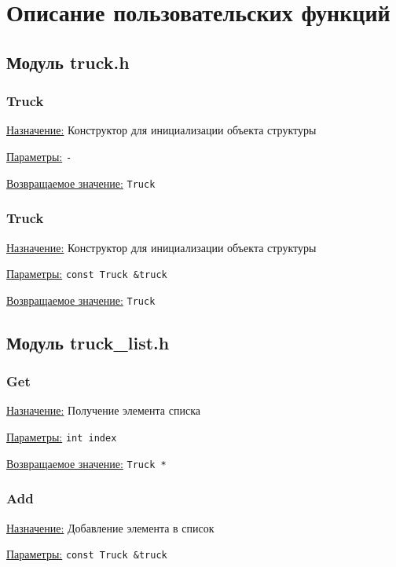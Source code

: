 \section*{Описание пользовательских функций}

\subsection*{Модуль truck.h}

\subsubsection*{Truck}

\underline{Назначение:} Конструктор для инициализации объекта структуры

\underline{Параметры:} \verb|-|

\underline{Возвращаемое значение:} \verb|Truck|


\subsubsection*{Truck}

\underline{Назначение:} Конструктор для инициализации объекта структуры

\underline{Параметры:} \verb|const Truck &truck|

\underline{Возвращаемое значение:} \verb|Truck|


\subsection*{Модуль truck\_list.h}

\subsubsection*{Get}

\underline{Назначение:} Получение элемента списка

\underline{Параметры:} \verb|int index|

\underline{Возвращаемое значение:} \verb|Truck *|


\subsubsection*{Add}

\underline{Назначение:} Добавление элемента в список

\underline{Параметры:} \verb|const Truck &truck|


